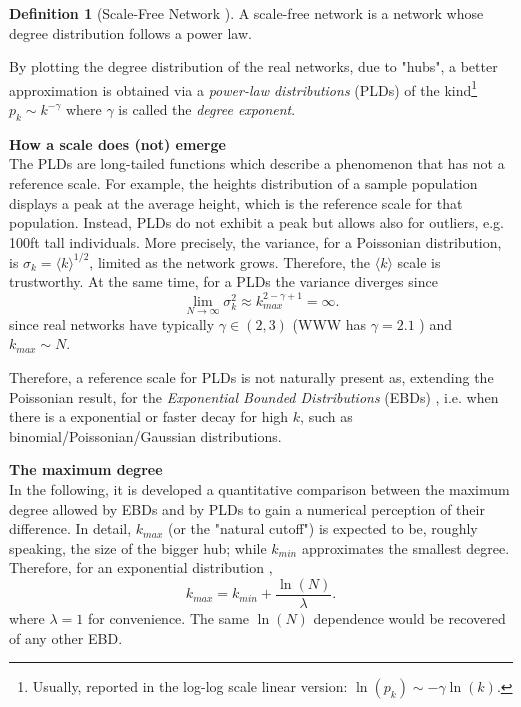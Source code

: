 \documentclass[a4paper,10pt, oneside]{book} %
\theoremstyle{definition}
\newtheorem{definition}{Definition}[section]
\begin{document}
\begin{definition}[Scale-Free Network \cite{Barabasi:1999_ScalRndNet}]
	A scale-free network is a network whose degree distribution follows a power law.
\end{definition}

By plotting the degree distribution of the real networks, due to "hubs", a better approximation is obtained via a \textit{power-law distributions} (PLDs) of the kind\footnote{Usually, reported in the log-log scale linear version: $\ln(p_k) \sim -\gamma \ln(k)$.} $p_k \sim k^{-\gamma}$  where $\gamma$ is called the \textit{degree exponent}. 

{\large \textbf{How a scale does (not) emerge}} \\
The PLDs are long-tailed functions which describe a phenomenon that has not a reference scale.
For example, the heights distribution of a sample population displays a peak at the average height, which is the reference scale for that population. Instead, PLDs do not exhibit a peak but allows also for outliers, e.g. 100ft tall individuals.
More precisely, the variance, for a Poissonian distribution, is $\sigma_k = \langle k \rangle ^ {1/2}$, limited as the network grows. Therefore, the $\langle k \rangle$ scale is trustworthy. 
At the same time, for a PLDs the variance diverges since \cite{barabasi::2016networkbook}	
\begin{equation}
	\lim_{N \to \infty} \sigma_k^2 \approx k_{max}^{2-\gamma+1} = \infty.
	\label{eq:sigma_SFnets}
\end{equation}
since real networks have typically $\gamma \in (2,3)$ (WWW has $\gamma =  2.1$ \cite{barabasi::2016networkbook}) and $k_{max} \sim N$. 

Therefore, a reference scale for PLDs is not naturally present as, extending the Poissonian result, for the \textit{Exponential Bounded Distributions} (EBDs) \cite{barabasi::2016networkbook}, i.e. when there is a exponential or faster decay for high $k$, such as binomial/Poissonian/Gaussian distributions.

{\large \textbf{The maximum degree}} \\
In the following, it is developed a quantitative comparison between the maximum degree allowed by EBDs and by PLDs to gain a numerical perception of their difference.
In detail, $k_{max}$ (or the "natural cutoff") is expected to be, roughly speaking, the size of the bigger hub; while $k_{min}$ approximates the smallest degree.
Therefore, for an exponential distribution \cite{barabasi::2016networkbook}, 
\begin{equation}
	k_{max} = k_{min} + \frac{\ln(N)}{\lambda}.
	\label{eq:Expkmax_up}	
\end{equation}
where $\lambda = 1$ for convenience. The same $\ln(N)$ dependence would be recovered of any other EBD.
\end{document}
